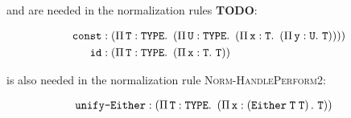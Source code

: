  and  are needed in the normalization rules \textbf{TODO}:

\begin{align}
	\texttt{const} & : \left(\Pi\,\mathit{\texttt{T}}:\texttt{TYPE}.\ \left(\Pi\,\mathit{\texttt{U}}:\texttt{TYPE}.\ \left(\Pi\,\mathit{\texttt{x}}:\texttt{T}.\ \left(\Pi\,\mathit{\texttt{y}}:\texttt{U}.\ \texttt{T}\right)\right)\right)\right) \\
	\texttt{id} & : \left(\Pi\,\mathit{\texttt{T}}:\texttt{TYPE}.\ \left(\Pi\,\mathit{\texttt{x}}:\texttt{T}.\ \texttt{T}\right)\right)
\end{align}

 is also needed in the normalization rule \textsc{Norm-HandlePerform2}:

\begin{align}
	\texttt{unify-Either} & : \left(\Pi\,\mathit{\texttt{T}}:\texttt{TYPE}.\ \left(\Pi\,\mathit{\texttt{x}}:\left(\texttt{\texttt{Either}}\;\texttt{T}\;\texttt{T}\right).\ \texttt{T}\right)\right)
\end{align}
